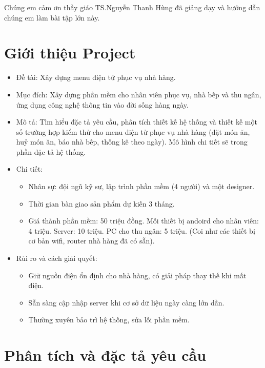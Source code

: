\documentclass[a4paper,12pt]{report}
\begin{document}
Chúng em cảm ơn thầy giáo TS.Nguyễn Thanh Hùng đã giảng dạy và hướng dẫn chúng em làm bài tập lớn này.

\chapter{Giới thiệu Project}
\begin{itemize}
\item Đề tài: Xây dựng menu điện tử phục vụ nhà hàng. 
\item Mục đích: Xây dựng phần mềm cho nhân viên phục vụ, nhà bếp và thu ngân, ứng dụng công nghệ thông tin vào đời sống hàng ngày.
\item Mô tả: Tìm	hiểu đặc	tả yêu	cầu,	phân	tích	thiết kế hệ thống	và	thiết	kế một	số
trường	hợp	kiểm	thử cho menu	điện	tử phục	vụ nhà	hàng (đặt	món	ăn,	huỷ món	
ăn,	báo	nhà	bếp,	thống	kê	theo	ngày). Mô hình chi tiết sẽ trong phần đặc tả hệ thống.
\item Chi tiết:
\begin{itemize}
       \item Nhân sự: đội ngũ kỹ sư, lập trình phần mềm (4 người) và một designer.
       \item Thời gian bàn giao sản phẩm dự kiến 3 tháng.
       \item Giá thành phần mềm: 50 triệu đồng. Mỗi thiết bị andoird cho nhân viên: 4 triệu. Server: 10 triệu. PC cho thu ngân: 5 triệu. (Coi như các thiết bị cơ bản wifi, router nhà hàng đã có sẵn).
      \end{itemize}
\item Rủi ro và cách giải quyết:
\begin{itemize}
        \item{Giữ nguồn điện ổn định cho nhà hàng, có giải pháp thay thế khi mất điện.}
        \item{Sẵn sàng cập nhập server khi cơ sở dữ liệu ngày càng lớn dần.}
        \item{Thường xuyên bảo trì hệ thống, sửa lỗi phần mềm.}
      \end{itemize}
\end{itemize}


\chapter{Phân tích và đặc tả yêu cầu}
\end{document}
